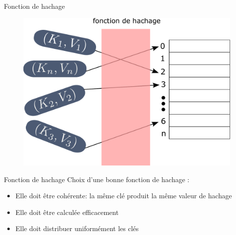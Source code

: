\documentclass[12pt,a4paper]{beamer}
\begin{document}
\begin{frame}{Fonction de hachage}
\vspace{-1em}
\begin{block}{}
\begin{figure}
\includegraphics[scale=0.3]{figs/ht_hf}
\end{figure}
\end{block}
\end{frame}

\begin{frame}{Fonction de hachage}
Choix d'une bonne fonction de hachage :
\begin{itemize}
\item Elle doit être cohérente: la même clé produit la même valeur de hachage
\item Elle doit être calculée efficacement 
\item Elle doit distribuer uniformément les clés
\end{itemize}

\end{frame}
\end{document}
